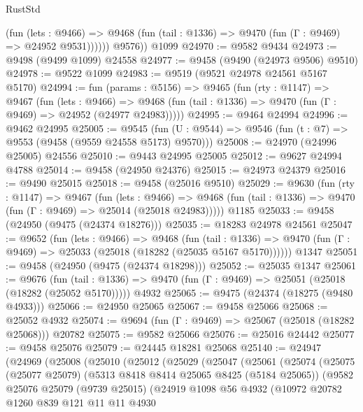 \begin{lexlean}{RustStd}
\begin{coremodule}
              (fun (lets : @9466) =>
              @9468 (fun (tail : @1336) => @9470 (fun (Γ : @9469) => @24952 @9531))))))
        @9576))
    @1099
@24970 := @9582 @9434
@24973 := @9498 (@9499 @1099) @24558
@24977 := @9458 (@9490 (@24973 @9506) @9510)
@24978 := @9522 @1099
@24983 := @9519 (@9521 @24978 @24561 @5167 @5170)
@24994 := fun (params : @5156) =>
  @9465
    (fun (rty : @1147) =>
    @9467
      (fun (lets : @9466) =>
      @9468 (fun (tail : @1336) => @9470 (fun (Γ : @9469) => @24952 (@24977 @24983)))))
@24995 := @9464 @24994
@24996 := @9462 @24995
@25005 := @9545
    (fun (U : @9544) => @9546 (fun (t : @7) => @9553 (@9458 (@9559 @24558 @5173) @9570)))
@25008 := @24970 (@24996 @25005) @24556
@25010 := @9443 @24995 @25005
@25012 := @9627 @24994 @4788
@25014 := @9458 (@24950 @24376)
@25015 := @24973 @24379
@25016 := @9490 @25015
@25018 := @9458 (@25016 @9510)
@25029 := @9630
    (fun (rty : @1147) =>
    @9467
      (fun (lets : @9466) =>
      @9468 (fun (tail : @1336) => @9470 (fun (Γ : @9469) => @25014 (@25018 @24983)))))
    @1185
@25033 := @9458 (@24950 (@9475 (@24374 @18276)))
@25035 := @18283 @24978 @24561
@25047 := @9652
    (fun (lets : @9466) =>
    @9468
      (fun (tail : @1336) =>
      @9470 (fun (Γ : @9469) => @25033 (@25018 (@18282 (@25035 @5167 @5170))))))
    @1347
@25051 := @9458 (@24950 (@9475 (@24374 @18298)))
@25052 := @25035 @1347
@25061 := @9676
    (fun (tail : @1336) => @9470 (fun (Γ : @9469) => @25051 (@25018 (@18282 (@25052 @5170)))))
    @4932
@25065 := @9475 (@24374 (@18275 (@9480 @4933)))
@25066 := @24950 @25065
@25067 := @9458 @25066
@25068 := @25052 @4932
@25074 := @9694 (fun (Γ : @9469) => @25067 (@25018 (@18282 @25068))) @20782
@25075 := @9582 @25066
@25076 := @25016 @24442
@25077 := @9458 @25076
@25079 := @24445 @18281 @25068
@25140 := @24947
    (@24969
      (@25008
        (@25010
          (@25012
            (@25029
              (@25047
                (@25061
                  (@25074
                    (@25075
                      (@25077 @25079)
                      (@5313 @8418 @8414 @25065 @8425 (@5184 @25065))
                      (@9582
                        @25076
                        @25079
                        (@9739 @25015)
                        (@24919
                          @1098
                          @56
                          @4932
                          (@10972
                            @20782
                            @1260
                            @839
                            @121
                            @11
                            @11
                            @4930

\end{coremodule}
\end{lexlean}
